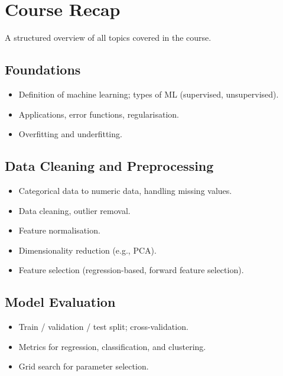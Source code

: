 \documentclass[11pt,a4paper]{article}
\theoremstyle{definition}
\theoremstyle{plain}
\theoremstyle{remark}
\begin{document}
\section{Course Recap}

A structured overview of all topics covered in the course.

\subsection{Foundations}

\begin{itemize}
    \item Definition of machine learning; types of ML (supervised, unsupervised).
    \item Applications, error functions, regularisation.
    \item Overfitting and underfitting.
\end{itemize}

\subsection{Data Cleaning and Preprocessing}

\begin{itemize}
    \item Categorical data to numeric data, handling missing values.
    \item Data cleaning, outlier removal.
    \item Feature normalisation.
    \item Dimensionality reduction (e.g., PCA).
    \item Feature selection (regression-based, forward feature selection).
\end{itemize}

\subsection{Model Evaluation}

\begin{itemize}
    \item Train / validation / test split; cross-validation.
    \item Metrics for regression, classification, and clustering.
    \item Grid search for parameter selection.
\end{itemize}
\end{document}
